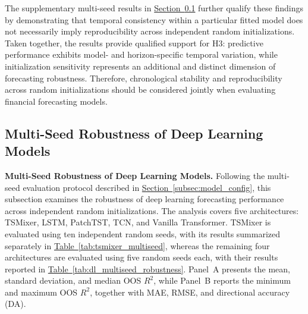 \documentclass[runningheads,orivec]{llncs}
\begin{document}
The supplementary multi-seed results in \hyperref[subsec:multiseed_robustness]{Section~\ref*{subsec:multiseed_robustness}} further qualify these findings by demonstrating that temporal consistency within a particular fitted model does not necessarily imply reproducibility across independent random initializations. Taken together, the results provide qualified support for H3: predictive performance exhibits model- and horizon-specific temporal variation, while initialization sensitivity represents an additional and distinct dimension of forecasting robustness. Therefore, chronological stability and reproducibility across random initializations should be considered jointly when evaluating financial forecasting models.


\subsection{Multi-Seed Robustness of Deep Learning Models}\label{subsec:multiseed_robustness}

\noindent\textbf{Multi-Seed Robustness of Deep Learning Models.} Following the multi-seed evaluation protocol described in \hyperref[subsec:model_config]{Section~\ref*{subsec:model_config}}, this subsection examines the robustness of deep learning forecasting performance across independent random initializations. The analysis covers five architectures: TSMixer, LSTM, PatchTST, TCN, and Vanilla Transformer. TSMixer is evaluated using ten independent random seeds, with its results summarized separately in \hyperref[tab:tsmixer_multiseed]{Table~\ref*{tab:tsmixer_multiseed}}, whereas the remaining four architectures are evaluated using five random seeds each, with their results reported in \hyperref[tab:dl_multiseed_robustness]{Table~\ref*{tab:dl_multiseed_robustness}}. Panel~A presents the mean, standard deviation, and median OOS $R^2$, while Panel~B reports the minimum and maximum OOS $R^2$, together with MAE, RMSE, and directional accuracy (DA).
\end{document}
